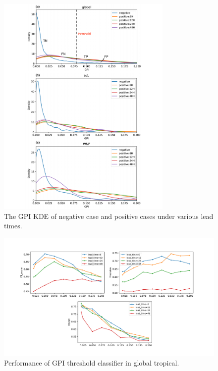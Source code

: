 \documentclass{article}
\begin{document}
\begin{figure}[h] %
\centering
\includegraphics[width=20pc]{figs/kde.pdf}
\caption{The GPI KDE of negative case and positive cases under various lead times. }
\label{figone}
\end{figure}


\begin{figure}[h] %
\includegraphics[width=30pc]{figs/GPI_thres_global_f1.pdf}
\caption{Performance of GPI threshold classifier in global tropical.}
\label{figone}
\end{figure}
\end{document}
